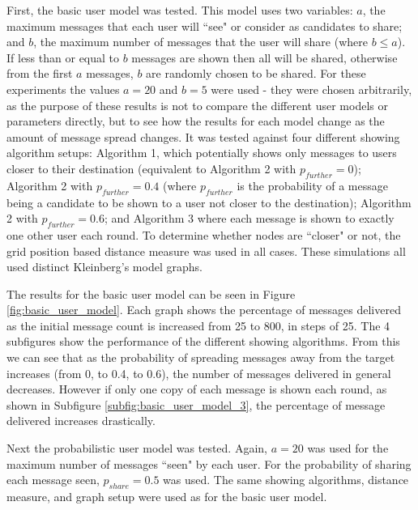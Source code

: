 \documentclass[bsc,frontabs,twoside,singlespacing,parskip,deptreport]{infthesis}     %
\begin{document}
First, the basic user model was tested. This model uses two variables: $a$, the maximum messages that each user will ``see" or consider as candidates to share; and $b$, the maximum number of messages that the user will share (where $b \leq a$). If less than or equal to $b$ messages are shown then all will be shared, otherwise from the first $a$ messages, $b$ are randomly chosen to be shared. For these experiments the values $a = 20$ and $b = 5$ were used - they were chosen arbitrarily, as the purpose of these results is not to compare the different user models or parameters directly, but to see how the results for each model change as the amount of message spread changes. It was tested against four different showing algorithm setups: Algorithm 1, which potentially shows only messages to users closer to their destination (equivalent to Algorithm 2 with $p_{further}=0$); Algorithm 2 with $p_{further}=0.4$ (where $p_{further}$ is the probability of a message being a candidate to be shown to a user not closer to the destination); Algorithm 2 with $p_{further}=0.6$; and Algorithm 3 where each message is shown to exactly one other user each round. To determine whether nodes are ``closer" or not, the grid position based distance measure was used in all cases. These simulations all used distinct Kleinberg's model graphs.

The results for the basic user model can be seen in Figure \ref{fig:basic_user_model}. Each graph shows the percentage of messages delivered as the initial message count is increased from 25 to 800, in steps of 25. The 4 subfigures show the performance of the different showing algorithms. From this we can see that as the probability of spreading messages away from the target increases (from 0, to 0.4, to 0.6), the number of messages delivered in general decreases. However if only one copy of each message is shown each round, as shown in  Subfigure \ref{subfig:basic_user_model_3}, the percentage of message delivered increases drastically.

Next the probabilistic user model was tested. Again, $a=20$ was used for the maximum number of messages ``seen" by each user. For the probability of sharing each message seen, $p_{share}=0.5$ was used. The same showing algorithms, distance measure, and graph setup were used as for the basic user model.
\end{document}
